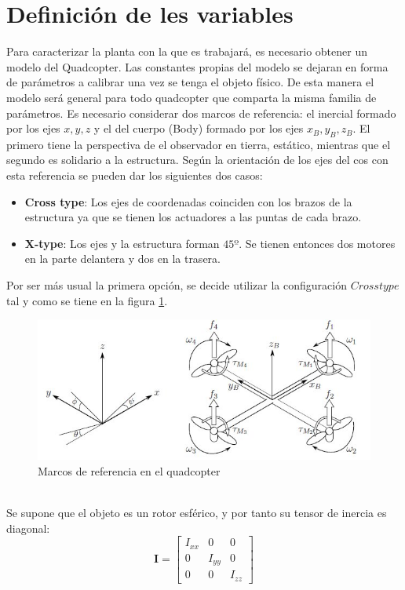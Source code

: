 \documentclass[twoside,11pt]{report}
\begin{document}
\section{Definición de les variables}
Para caracterizar la planta con la que es trabajará, es necesario obtener un modelo del Quadcopter. Las constantes propias del modelo se dejaran en forma de parámetros a calibrar una vez se tenga el objeto físico. De esta manera el modelo será general para todo quadcopter que comparta la misma familia de parámetros.
Es necesario considerar dos marcos de referencia: el inercial formado por los ejes $x,y,z$ y el del cuerpo (Body) formado por los ejes $x_B,y_B,z_B$. El primero tiene la perspectiva de el observador en tierra, estático, mientras que el segundo es solidario a la estructura. Según la orientación de los ejes del cos con esta referencia se pueden dar los siguientes dos casos:
\begin{itemize}
\item \textbf{Cross type}: Los ejes de coordenadas coinciden con los brazos de la estructura ya que se tienen los actuadores a las puntas de cada brazo.
\item \textbf{X-type}: Los ejes y la estructura forman $45º$. Se tienen entonces dos motores en la parte delantera y dos en la trasera.
\end{itemize} 
Por ser más usual la primera opción, se decide utilizar la configuración $Cross type$ tal y como se tiene en la figura \ref{RefQuad}.
\begin{figure}[h!]
\centering
\includegraphics[scale=0.5]{images/quad.jpg}
\caption{Marcos de referencia en el quadcopter}
\label{RefQuad}
\end{figure}\\
Se supone que el objeto es un rotor esférico, y por tanto su tensor de inercia es diagonal:
\begin{equation}\textbf{I}=\left[ \begin{array}{ccc}
I_{xx} & 0 & 0 \\
0 & I_{yy} & 0 \\
0 & 0 & I_{zz} 
\end{array} \right] \end{equation}
\end{document}

